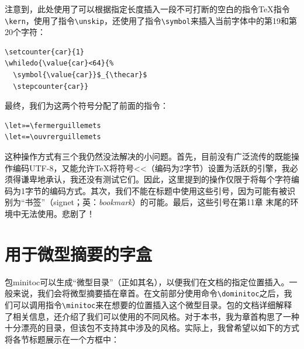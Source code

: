 注意到，此处使用了可以根据指定长度插入一段不可打断的空白的指令\TeX 指令\verb|\kern|，使用了指令\verb|\unskip|，还使用了指令\verb|\symbol|来插入当前字体中的第19和第20个字符：

\begin{codelist}[10.10]{
\setcounter{car}{1}
 \selectfont
{}
}
\begin{verbatim}
\setcounter{car}{1}
\whiledo{\value{car}<64}{%
  \symbol{\value{car}}$_{\thecar}$
  \stepcounter{car}}\end{verbatim}
\end{codelist}

最终，我们为这两个符号分配了前面的指令：

\begin{dmd}
\begin{verbatim}
\let»=\fermerguillemets
\let«=\ouvrerguillemets\end{verbatim}
\end{dmd}

\begin{qquestion}
这种操作方式有三个我仍然没法解决的小问题。首先，目前没有广泛流传的既能操作编码UTF-8，又能允许\TeX 将符号<<（编码为2字节）设置为活跃的引擎，我必须得谦卑地承认，我还没有测试它们。因此，这里提到的操作仅限于将每个字符编码为1字节的编码方式。其次，我们不能在标题中使用这些引号，因为可能有被识别为“书签”（signet；英：\emph{bookmark}）的可能。最后，这些引号在第11章%
末尾的环境中无法使用。悲剧了！
\end{qquestion}

\section{用于微型摘要的字盒}

包\textsf{minitoc}可以生成“微型目录”（正如其名），以便我们在文档的指定位置插入。一般来说，我们会将微型摘要插在章首。在文前部分使用命令\verb|\dominitoc|之后，我们可以调用指令\verb|\minitoc|来在想要的位置插入这个微型目录。包的文档详细解释了相关信息，还介绍了我们可以使用的不同风格。对于本书，我为章首构思了一种十分漂亮的目录，但该包不支持其中涉及的风格。实际上，我曾希望以如下的方式将各节标题展示在一个方框中：

\begin{center}
\end{center}

